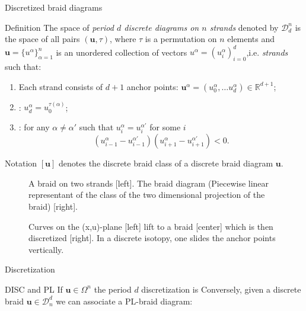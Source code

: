 \documentclass[9pt, english]{beamer}
\theoremstyle{definition}
\newcommand{\simbolovettore}[1]{{\boldsymbol{#1}}}
\newcommand{\vu}{\simbolovettore{u}}
\newcommand{\R}{\mathbb{R}}                     %
\begin{document}
\begin{frame}{Discretized braid diagrams}
    \begin{block}{Definition}
        The space of {\em period $d$ discrete diagrams on $n$ strands\/}
        denoted by $\mathscr D_d^n$ is the space of all pairs $(\vu,
        \tau)$, \pause where $\tau$ is a permutation on $n$ elements \pause and
        $\vu=\{u^\alpha\}_{\alpha=1}^n$ is an unordered collection of
        vectors $u^\alpha=(u_i^\alpha)_{i=0}^d$,\pause i.e. {\em strands\/}
        such that:
        \begin{enumerate}
        \item Each strand consists of $d+1$ anchor points: $\vu^\alpha=(u_0^\alpha, \dots u_d^\alpha)\in
        \R^{d+1}$;\pause
        \item {\color{red}{(Periodicity)}\/}: $u_d^\alpha= u_0^{\tau(\alpha)}$;\pause
        \item {\color{red}{(Transversality)}\/}: for any $\alpha\neq \alpha'$ such
        that $u_i^\alpha=u_i^{\alpha'}$ for some $i$
        \[
        (u_{i-1}^\alpha - u_{i-1}^{\alpha'})(u_{i+1}^\alpha-
        u_{i+1}^{\alpha'})<0.
        \]
        \end{enumerate}
        \end{block}
\end{frame}
\begin{frame}
        \begin{block}{Notation}
            $[\vu]$ denotes the discrete braid class of a discrete braid
            diagram $\vu$.
        \end{block}
       \begin{figure}\label{fig:PLdiagram}
        \caption{A braid on two strands [left]. The braid diagram
        (Piecewise linear representant of the class of the two dimensional projection of the
        braid) [right].}
        \end{figure}
\end{frame}
\begin{frame}
        \begin{figure}\label{fig:fig1Inve}
        \caption{Curves on the (x,u)-plane [left] lift to a braid [center]
        which is then discretized [right]. In a discrete isotopy, one slides the anchor points vertically.}
        \end{figure}
\end{frame}
\begin{frame}{Discretization}
    \begin{block}{DISC and PL}
        If $\vu \in \Omega^n$ the period $d$ discretization is
        {\color{green}{
        \[
        DISC_d(\vu):={u^\alpha(i/d)}_i^\alpha
        \]}\/}
        \pause
        Conversely, given a discrete braid $\vu\in \mathscr D_n^d$ we
        can associate a PL-braid diagram:\pause
        {\color{red}{
        \[
        PL(u^\alpha)(x):=u^\alpha_{\lfloor d\cdot x\rfloor}+ (d\cdot x-\lfloor d\cdot
        x\rfloor)(u^\alpha_{\lceil d\cdot x\rceil}-u^\alpha_{\lfloor d\cdot x\rfloor}).
        \]}\/}
    \end{block}
\end{frame}
\end{document}
